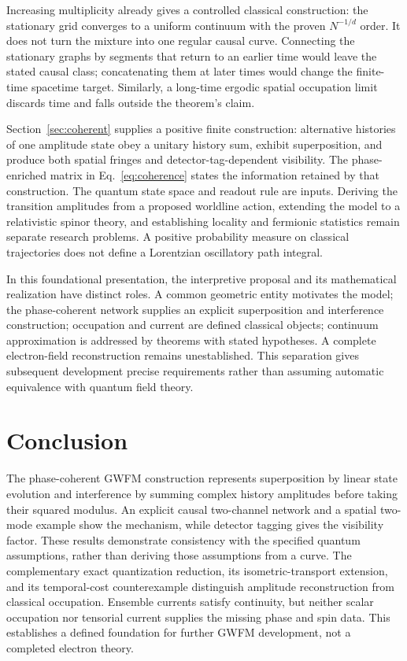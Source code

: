 \documentclass[aip,jmp,reprint,onecolumn,amsmath,amssymb]{revtex4-2}
\theoremstyle{definition}
\begin{document}
Increasing multiplicity already gives a controlled classical construction: the stationary grid converges to a uniform continuum with the proven $N^{-1/d}$ order. It does not turn the mixture into one regular causal curve. Connecting the stationary graphs by segments that return to an earlier time would leave the stated causal class; concatenating them at later times would change the finite-time spacetime target. Similarly, a long-time ergodic spatial occupation limit discards time and falls outside the theorem's claim.

Section~\ref{sec:coherent} supplies a positive finite construction: alternative histories of one amplitude state obey a unitary history sum, exhibit superposition, and produce both spatial fringes and detector-tag-dependent visibility. The phase-enriched matrix in Eq.~\eqref{eq:coherence} states the information retained by that construction. The quantum state space and readout rule are inputs. Deriving the transition amplitudes from a proposed worldline action, extending the model to a relativistic spinor theory, and establishing locality and fermionic statistics remain separate research problems. A positive probability measure on classical trajectories does not define a Lorentzian oscillatory path integral.

In this foundational presentation, the interpretive proposal and its mathematical realization have distinct roles. A common geometric entity motivates the model; the phase-coherent network supplies an explicit superposition and interference construction; occupation and current are defined classical objects; continuum approximation is addressed by theorems with stated hypotheses. A complete electron-field reconstruction remains unestablished. This separation gives subsequent development precise requirements rather than assuming automatic equivalence with quantum field theory.

\section{Conclusion}
The phase-coherent GWFM construction represents superposition by linear state evolution and interference by summing complex history amplitudes before taking their squared modulus. An explicit causal two-channel network and a spatial two-mode example show the mechanism, while detector tagging gives the visibility factor. These results demonstrate consistency with the specified quantum assumptions, rather than deriving those assumptions from a curve. The complementary exact quantization reduction, its isometric-transport extension, and its temporal-cost counterexample distinguish amplitude reconstruction from classical occupation. Ensemble currents satisfy continuity, but neither scalar occupation nor tensorial current supplies the missing phase and spin data. This establishes a defined foundation for further GWFM development, not a completed electron theory.
\end{document}
